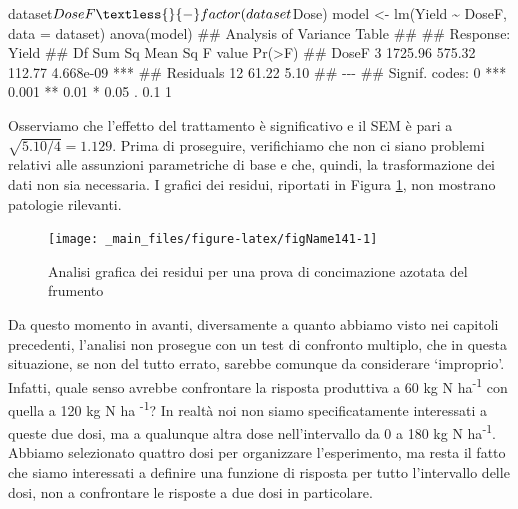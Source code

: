 \documentclass[a4paper,12pt,oneside]{book}
\newenvironment{Shaded}{\begin{snugshade}}{\end{snugshade}}
\newcommand{\SpecialCharTok}[1]{#1}
\newcommand{\DocumentationTok}[1]{#1}
\newcommand{\OtherTok}[1]{#1}
\newcommand{\FunctionTok}[1]{#1}
\newcommand{\AttributeTok}[1]{#1}
\newcommand{\NormalTok}[1]{#1}
\begin{document}
\begin{Shaded}
\begin{Highlighting}[]
\NormalTok{dataset}\SpecialCharTok{$}\NormalTok{DoseF }\OtherTok{\textless{}{-}} \FunctionTok{factor}\NormalTok{(dataset}\SpecialCharTok{$}\NormalTok{Dose)}
\NormalTok{model }\OtherTok{\textless{}{-}} \FunctionTok{lm}\NormalTok{(Yield }\SpecialCharTok{\textasciitilde{}}\NormalTok{ DoseF, }\AttributeTok{data =}\NormalTok{ dataset)}
\FunctionTok{anova}\NormalTok{(model)}
\DocumentationTok{\#\# Analysis of Variance Table}
\DocumentationTok{\#\# }
\DocumentationTok{\#\# Response: Yield}
\DocumentationTok{\#\#           Df  Sum Sq Mean Sq F value    Pr(\textgreater{}F)    }
\DocumentationTok{\#\# DoseF      3 1725.96  575.32  112.77 4.668e{-}09 ***}
\DocumentationTok{\#\# Residuals 12   61.22    5.10                      }
\DocumentationTok{\#\# {-}{-}{-}}
\DocumentationTok{\#\# Signif. codes:  0 \textquotesingle{}***\textquotesingle{} 0.001 \textquotesingle{}**\textquotesingle{} 0.01 \textquotesingle{}*\textquotesingle{} 0.05 \textquotesingle{}.\textquotesingle{} 0.1 \textquotesingle{} \textquotesingle{} 1}
\end{Highlighting}
\end{Shaded}

Osserviamo che l'effetto del trattamento è significativo e il SEM è pari a \(\sqrt{5.10/4} = 1.129\). Prima di proseguire, verifichiamo che non ci siano problemi relativi alle assunzioni parametriche di base e che, quindi, la trasformazione dei dati non sia necessaria. I grafici dei residui, riportati in Figura \ref{fig:figName141}, non mostrano patologie rilevanti.

\begin{figure}

{\centering \texttt{[image: \_main\_files/figure-latex/figName141-1]} 

}

\caption{Analisi grafica dei residui per una prova di concimazione azotata del frumento}\label{fig:figName141}
\end{figure}

Da questo momento in avanti, diversamente a quanto abbiamo visto nei capitoli precedenti, l'analisi non prosegue con un test di confronto multiplo, che in questa situazione, se non del tutto errato, sarebbe comunque da considerare `improprio'. Infatti, quale senso avrebbe confrontare la risposta produttiva a 60 kg N ha\textsuperscript{-1} con quella a 120 kg N ha \textsuperscript{-1}? In realtà noi non siamo specificatamente interessati a queste due dosi, ma a qualunque altra dose nell'intervallo da 0 a 180 kg N ha\textsuperscript{-1}. Abbiamo selezionato quattro dosi per organizzare l'esperimento, ma resta il fatto che siamo interessati a definire una funzione di risposta per tutto l'intervallo delle dosi, non a confrontare le risposte a due dosi in particolare.
\end{document}
